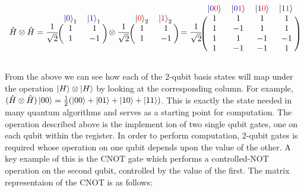 \begin{equation}
\hat{H}\otimes\hat{H}=\frac{1}{\sqrt{2}}
\begin{blockarray}{cc}
    \ket{\textcolor{blue}{0}}_1 & \ket{\textcolor{blue}{1}}_1 \\
    \begin{block}{(cc)}
        1 & 1\\
        1 & -1\\
    \end{block}
\end{blockarray}\otimes\frac{1}{\sqrt{2}}
\begin{blockarray}{cc}
    \ket{\textcolor{red}{0}}_2 & \ket{\textcolor{red}{1}}_2 \\
    \begin{block}{(cc)}
        1 & 1\\
        1 & -1\\
    \end{block}
\end{blockarray}=\frac{1}{\sqrt{2}}  
\begin{blockarray}{cccc}
    \ket{\textcolor{blue}{0}\textcolor{red}{0}} & \ket{\textcolor{blue}{0}\textcolor{red}{1}} & \ket{\textcolor{blue}{1}\textcolor{red}{0}} & \ket{\textcolor{blue}{1}\textcolor{red}{1}} \\
    \begin{block}{(cccc)}
        1 & 1 & 1 & 1\\
        1 & -1 & 1 & 1\\
        1 & 1 & -1 & -1\\
        1 & -1 & -1 & 1\\
    \end{block}
\end{blockarray}
\end{equation}

From the above we can see how each of the 2-qubit basis states will map under the operation $\left\vert{H}\right\rangle\otimes\left\vert{H}\right\rangle$ by looking at the corresponding column. For example, $(\hat{H}\otimes\hat{H})\left\vert{00}\right\rangle=\frac{1}{2}(\left\vert{00}\right\rangle+\left\vert{01}\right\rangle+\left\vert{10}\right\rangle+\left\vert{11}\right\rangle)$.
This is exactly the state needed in many quantum algorithms and serves as a starting point for computation. The operation described above is the implement ion of two single qubit gates, one on each qubit within the register. In order to perform computation, 2-qubit gates is required whose operation on one qubit depends upon the value of the other. A key example of this is the CNOT gate which performs a controlled-NOT operation on the second qubit, controlled by the value of the first. The matrix representaion of the CNOT is as follows:

